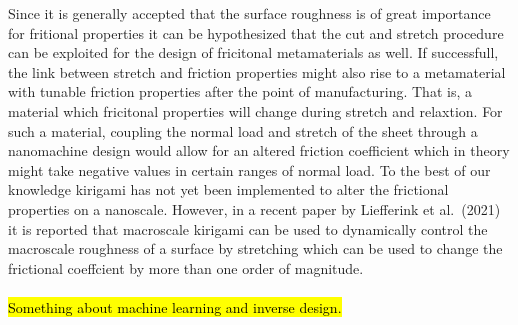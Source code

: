 Since it is generally accepted that the surface roughness is of great importance
for fritional properties it can be hypothesized that the cut and stretch
procedure can be exploited for the design of fricitonal metamaterials as well.
If successfull, the link between stretch and friction properties might also rise
to a metamaterial with tunable friction properties after the point of
manufacturing. That is, a material which fricitonal properties will change
during stretch and relaxtion. For such a material, coupling the normal load and
stretch of the sheet through a nanomachine design would allow for an altered
friction coefficient which in theory might take negative values in certain
ranges of normal load. To the best of our knowledge kirigami has not yet been
implemented to alter the frictional properties on a nanoscale. However, in a
recent paper by Liefferink et al.\ \cite{LIEFFERINK2021101475}(2021) it is
reported that macroscale kirigami can be used to dynamically control the macroscale roughness of a surface by stretching which can be used to change the frictional coeffcient by more than one order of magnitude.
\\
\\
\hl{Something about machine learning and inverse design.}









